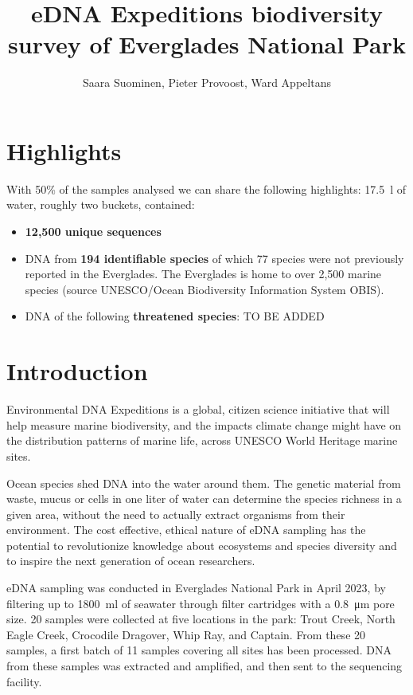 \documentclass[10pt]{article}
\title{eDNA Expeditions biodiversity survey of Everglades National Park}
\author{Saara Suominen, Pieter Provoost, Ward Appeltans}
\begin{document}

\maketitle

\section*{Highlights}

With 50\% of the samples analysed we can share the following highlights: \SI{17.5}{\litre} of water, roughly two buckets, contained:

\begin{itemize}
\item \textbf{12,500 unique sequences}
\item DNA from \textbf{194 identifiable species} of which 77 species were not previously reported in the Everglades. The Everglades is home to over 2,500 marine species (source UNESCO/Ocean Biodiversity Information System OBIS).
\item DNA of the following \textbf{threatened species}: TO BE ADDED
\end{itemize}

\section*{Introduction}

\begin{multicols}{2}
Environmental DNA Expeditions is a global, citizen science initiative that will help measure marine biodiversity, and the impacts climate change might have on the distribution patterns of marine life, across UNESCO World Heritage marine sites.

Ocean species shed DNA into the water around them. The genetic material from waste, mucus or cells in one liter of water can determine the species richness in a given area, without the need to actually extract organisms from their environment.
The cost effective, ethical nature of eDNA sampling has the potential to revolutionize knowledge about ecosystems and species diversity and to inspire the next generation of ocean researchers.

eDNA sampling was conducted in Everglades National Park in April 2023, by filtering up to \SI{1800}{\milli\litre} of seawater through filter cartridges with a \SI{0.8}{\micro\metre} pore size. 20 samples were collected at five locations in the park: Trout Creek, North Eagle Creek, Crocodile Dragover, Whip Ray, and Captain. From these 20 samples, a first batch of 11 samples covering all sites has been processed. DNA from these samples was extracted and amplified, and then sent to the sequencing facility.
\end{multicols}
\end{document}
